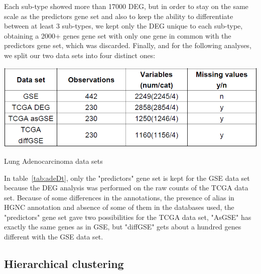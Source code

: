 \documentclass[twocolumn,12pt]{article}
\begin{document}
Each sub-type showed more than 17000 DEG, but in order to stay on the same scale as the predictors gene set and also to keep the ability to differentiate between at least 3 sub-types, we kept only the DEG unique to each sub-type, obtaining a 2000+ genes gene set with only one gene in common with the predictors gene set, which was discarded.
Finally, and for the following analyses, we split our two data sets into four distinct ones:
\begin{table}[!]
    \centering
    \includegraphics[scale=0.4]{img/adenodatasets.png}
    \caption{Lung Adenocarcinoma data sets}
    \label{tab:adeDt}
\end{table}
In table~\ref{tab:adeDt}, only the "predictors" gene set is kept for the GSE data set because the DEG analysis was performed on the raw counts of the TCGA data set.
Because of some differences in the annotations, the presence of alias in HGNC annotation and absence of some of them in the databases used, the "predictors" gene set gave two possibilities for the TCGA data set, "AsGSE" has exactly the same genes as in GSE, but "diffGSE" gets about a hundred genes different with the GSE data set.

\subsection{Hierarchical clustering}
\end{document}
